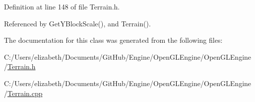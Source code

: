 Definition at line 148 of file Terrain.\+h.



Referenced by Get\+Y\+Block\+Scale(), and Terrain().



The documentation for this class was generated from the following files\+:\begin{DoxyCompactItemize}
\item 
C\+:/\+Users/elizabeth/\+Documents/\+Git\+Hub/\+Engine/\+Open\+G\+L\+Engine/\+Open\+G\+L\+Engine/\hyperlink{_terrain_8h}{Terrain.\+h}\item 
C\+:/\+Users/elizabeth/\+Documents/\+Git\+Hub/\+Engine/\+Open\+G\+L\+Engine/\+Open\+G\+L\+Engine/\hyperlink{_terrain_8cpp}{Terrain.\+cpp}\end{DoxyCompactItemize}
